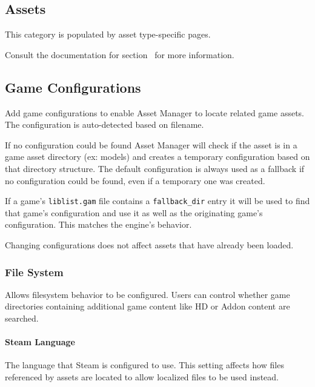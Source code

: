 \documentclass[10pt, a4paper, titlepage, oneside]{article}
\newcommand{\code}[1]{\mbox{\texttt{#1}}}
\begin{document}
\newpage

\subsection{Assets}

This category is populated by asset type-specific pages.

Consult the documentation for section~ for more information.

\subsection{Game Configurations}
\label{sec:game_configurations}

Add game configurations to enable Asset Manager to locate related game assets.
The configuration is auto-detected based on filename.

\vspace{\baselineskip}
If no configuration could be found Asset Manager will check if the asset is in a game asset directory (ex: models) and creates a temporary configuration based on that directory structure.
The default configuration is always used as a fallback if no configuration could be found, even if a temporary one was created.

\vspace{\baselineskip}
If a game's \code{liblist.gam} file contains a \code{fallback\_dir} entry it will be used to find that game's configuration and use it as well as the originating game's configuration. This matches the engine's behavior.

\vspace{\baselineskip}
Changing configurations does not affect assets that have already been loaded.

\subsubsection{File System}

Allows filesystem behavior to be configured. Users can control whether game directories containing additional game content like HD or Addon content are searched.

\paragraph{Steam Language}

The language that Steam is configured to use. This setting affects how files referenced by assets are located to allow localized files to be used instead.
\end{document}

